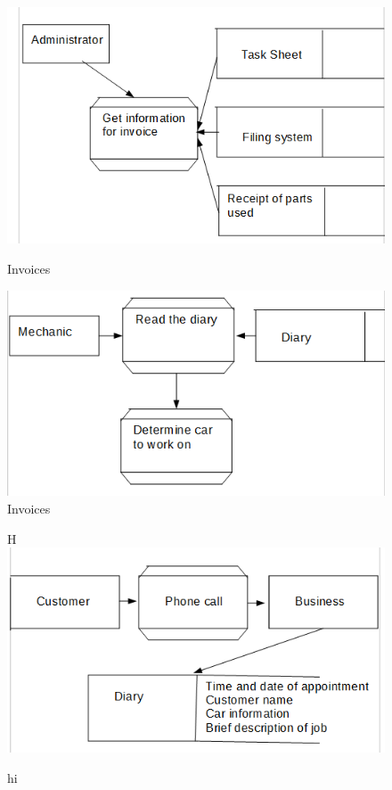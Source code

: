 \documentclass{article}
\begin{document}
	\begin{figure}[H]	
	
	\includegraphics[width=\textwidth]{invoices.png}
    \caption{Invoices}
    
    \includegraphics[width=\textwidth]{DeterminingWhatCarToWorkOn.PNG}
    \caption{Invoices}     
    
    \end{figure}
    
    \newpage
    
    \begin{figure}{H}
    \includegraphics[width=\textwidth]{BookingJobsIn.PNG}
    \caption{hi}
    
    
    \end{figure}
\end{document}
